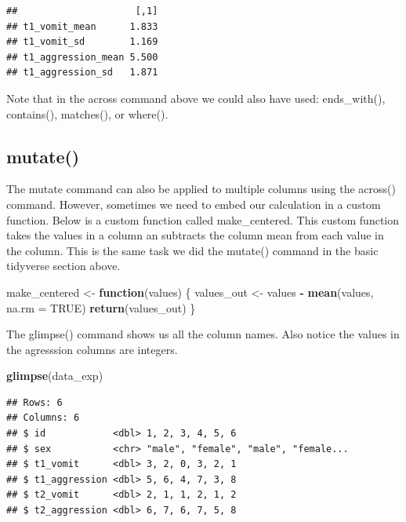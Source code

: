 \documentclass[
]{krantz}
\makeatletter
\newenvironment{Shaded}{\begin{snugshade}}{\end{snugshade}}
\newcommand{\ControlFlowTok}[1]{\textcolor[rgb]{0.27,0.27,0.27}{\textbf{#1}}}
\newcommand{\DataTypeTok}[1]{\textcolor[rgb]{0.27,0.27,0.27}{#1}}
\newcommand{\KeywordTok}[1]{\textcolor[rgb]{0.27,0.27,0.27}{\textbf{#1}}}
\newcommand{\NormalTok}[1]{#1}
\newcommand{\OperatorTok}[1]{\textcolor[rgb]{0.43,0.43,0.43}{\textbf{#1}}}
\newcommand{\OtherTok}[1]{\textcolor[rgb]{0.37,0.37,0.37}{#1}}
\newcommand{\StringTok}[1]{\textcolor[rgb]{0.5,0.5,0.5}{#1}}
\newenvironment{kframe}{%
\medskip{}
\setlength{\fboxsep}{.8em}
 \def\at@end@of@kframe{}%
 \ifinner\ifhmode%
  \def\at@end@of@kframe{\end{minipage}}%
  \begin{minipage}{\columnwidth}%
 \fi\fi%
 \def\FrameCommand##1{\hskip\@totalleftmargin \hskip-\fboxsep
 \colorbox{shadecolor}{##1}\hskip-\fboxsep
     \hskip-\linewidth \hskip-\@totalleftmargin \hskip\columnwidth}%
 \MakeFramed {\advance\hsize-\width
   \@totalleftmargin\z@ \linewidth\hsize
   \@setminipage}}%
 {\par\unskip\endMakeFramed%
 \at@end@of@kframe}
\renewenvironment{Shaded}{\begin{kframe}}{\end{kframe}}
\makeatother
\begin{document}
\begin{verbatim}
##                     [,1]
## t1_vomit_mean      1.833
## t1_vomit_sd        1.169
## t1_aggression_mean 5.500
## t1_aggression_sd   1.871
\end{verbatim}

Note that in the across command above we could also have used: ends\_with(), contains(), matches(), or where().

\hypertarget{mutate-1}{%
\subsection{mutate()}\label{mutate-1}}

The mutate command can also be applied to multiple columns using the across() command. However, sometimes we need to embed our calculation in a custom function. Below is a custom function called make\_centered. This custom function takes the values in a column an subtracts the column mean from each value in the column. This is the same task we did the mutate() command in the basic tidyverse section above.

\begin{Shaded}
\begin{Highlighting}[]
\NormalTok{make_centered <-}\StringTok{ }\ControlFlowTok{function}\NormalTok{(values) \{}
\NormalTok{  values_out <-}\StringTok{ }\NormalTok{values }\OperatorTok{-}\StringTok{ }\KeywordTok{mean}\NormalTok{(values, }\DataTypeTok{na.rm =} \OtherTok{TRUE}\NormalTok{)}
  \KeywordTok{return}\NormalTok{(values_out)}
\NormalTok{\}}
\end{Highlighting}
\end{Shaded}

The glimpse() command shows us all the column names. Also notice the values in the agresssion columns are integers.

\begin{Shaded}
\begin{Highlighting}[]
\KeywordTok{glimpse}\NormalTok{(data_exp)}
\end{Highlighting}
\end{Shaded}

\begin{verbatim}
## Rows: 6
## Columns: 6
## $ id            <dbl> 1, 2, 3, 4, 5, 6
## $ sex           <chr> "male", "female", "male", "female...
## $ t1_vomit      <dbl> 3, 2, 0, 3, 2, 1
## $ t1_aggression <dbl> 5, 6, 4, 7, 3, 8
## $ t2_vomit      <dbl> 2, 1, 1, 2, 1, 2
## $ t2_aggression <dbl> 6, 7, 6, 7, 5, 8
\end{verbatim}
\end{document}
